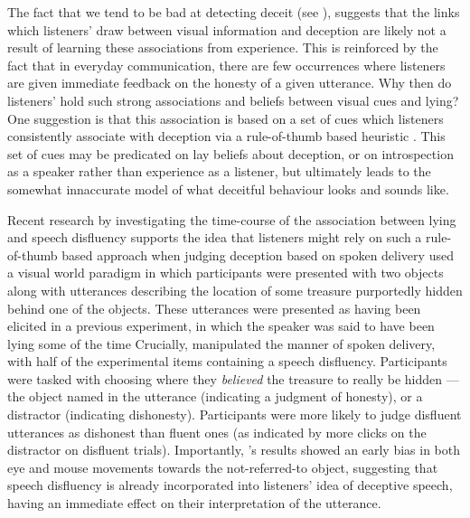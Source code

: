 \documentclass[a4paper,man,natbib]{apa6}
\begin{document}
The fact that we tend to be bad at detecting deceit (see \citet{Vrij2000}), suggests that the links which listeners' draw between visual information and deception are likely not a result of learning these associations from experience. %
This is reinforced by the fact that in everyday communication, there are few occurrences where listeners are given immediate feedback on the honesty of a given utterance.
Why then do listeners' hold such strong associations and beliefs between visual cues and lying?
One suggestion is that this association is based on a set of cues which listeners consistently associate with deception via a rule-of-thumb based heuristic \citep{DePaulo1982}.
This set of cues may be predicated on lay beliefs about deception, or on introspection as a speaker rather than experience as a listener, but ultimately leads to the somewhat innaccurate model of what deceitful behaviour looks and sounds like. 

Recent research by \citet{Loy2017} investigating the time-course of the association between lying and speech disfluency supports the idea that listeners might rely on such a rule-of-thumb based approach when judging deception based on spoken delivery %
\citet{Loy2017} used a visual world paradigm in which participants were presented with two objects along with utterances describing the location of some treasure purportedly hidden behind one of the objects.
These utterances were presented as having been elicited in a previous experiment, in which the speaker was said to have been lying some of the time %
Crucially, \citet{Loy2017} manipulated the manner of spoken delivery, with half of the experimental items containing a speech disfluency.
Participants were tasked with choosing where they \textit{believed} the treasure to really be hidden --- the object named in the utterance (indicating a judgment of honesty), or a distractor (indicating dishonesty).
Participants were more likely to judge disfluent utterances as dishonest than fluent ones (as indicated by more clicks on the distractor on disfluent trials). 
Importantly, \citeauthor{Loy2017}'s results showed an early bias in both eye and mouse movements towards the not-referred-to object, suggesting that speech disfluency is already incorporated into listeners' idea of deceptive speech, having an immediate effect on their interpretation of the utterance. 
\end{document}

